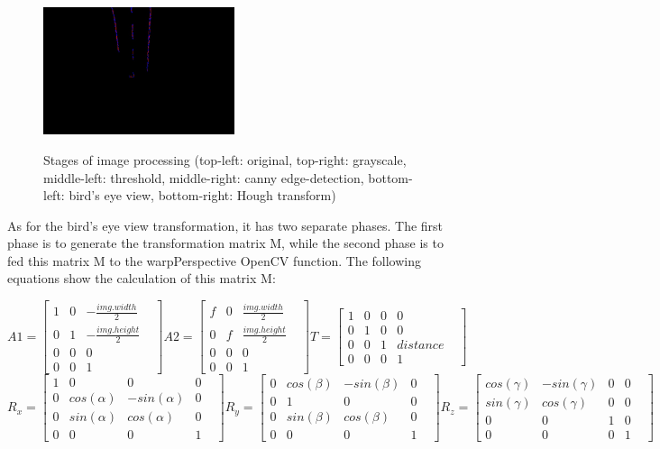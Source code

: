\documentclass[Report.tex]{subfiles}
\begin{document}
\begin{figure}[hp]
{    \includegraphics[width=0.5\textwidth]{figures/6_hough.jpeg}
  }
  \caption{Stages of image processing (top-left: original, top-right:
  grayscale, middle-left: threshold, middle-right: canny edge-detection,
bottom-left: bird's eye view, bottom-right: Hough transform)}
  \label{fig:img_proc}
\end{figure}

As for the bird's eye view transformation\cite{article:bird}, it has two
separate phases. The first phase is to generate the transformation matrix M,
while the second phase is to fed this matrix M to the
warpPerspective\cite{www:warp} OpenCV function.  The following equations show
the calculation of this matrix M:

\normalsize
\[
A1=
\begin{bmatrix}
  1 & 0 & -\frac{img.width}{2} & \\
  0 & 1 & -\frac{img.height}{2} & \\
  0 & 0 & 0 & \\
  0 & 0 & 1 &
\end{bmatrix}
A2=
\begin{bmatrix}
  f & 0 & \frac{img.width}{2} & \\
  0 & f & \frac{img.height}{2} & \\
  0 & 0 & 0 & \\
  0 & 0 & 1 &
\end{bmatrix}
T=
\begin{bmatrix}
  1 & 0 & 0 & 0 & \\
  0 & 1 & 0 & 0 & \\
  0 & 0 & 1 & distance & \\
  0 & 0 & 0 & 1 &
\end{bmatrix}
\]
\[
R_{x}=
\begin{bmatrix}
  1 & 0 & 0 & 0 & \\
  0 & cos(\alpha) & -sin(\alpha) & 0 &  \\
  0 & sin(\alpha) & cos(\alpha) & 0 &  \\
  0 & 0 & 0 & 1 &
\end{bmatrix}
R_{y}=
\begin{bmatrix}
  0 & cos(\beta) & -sin(\beta) & 0 &  \\
  0 & 1 & 0 & 0 & \\
  0 & sin(\beta) & cos(\beta) & 0 &  \\
  0 & 0 & 0 & 1 &
\end{bmatrix}
R_{z}=
\begin{bmatrix}
  cos(\gamma) & -sin(\gamma) & 0 & 0 & \\
  sin(\gamma) & cos(\gamma) & 0 & 0 & \\
  0 & 0 & 1 & 0 & \\
  0 & 0 & 0 & 1 &
\end{bmatrix}
\]
\end{document}
